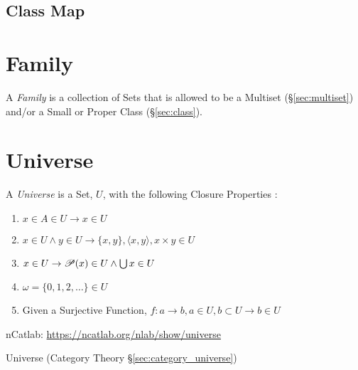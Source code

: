 \subsection{Class Map}\label{sec:class_map}



\section{Family}\label{sec:family}

A \emph{Family} is a collection of Sets that is allowed to be a
Multiset (\S\ref{sec:multiset}) and/or a Small or Proper Class
(\S\ref{sec:class}).



\section{Universe}\label{sec:set_universe}

A \emph{Universe} is a Set, $U$, with the following Closure Properties
\cite{maclane69}:
\begin{enumerate}
\item $x \in A \in U \rightarrow x \in U$
\item $x \in U \wedge y \in U \rightarrow \{x,y\}, \langle x,y
  \rangle, x \times y \in U$
\item $x \in U \rightarrow \mathscr{P}(x) \in U \wedge \bigcup x \in U$
\item $\omega = \{0,1,2,\ldots\} \in U$
\item Given a Surjective Function, $f : a \rightarrow b, a \in
  U, b \subset U \rightarrow b \in U$
\end{enumerate}

nCatlab: \url{https://ncatlab.org/nlab/show/universe}

\fist Universe (Category Theory \S\ref{sec:category_universe})




